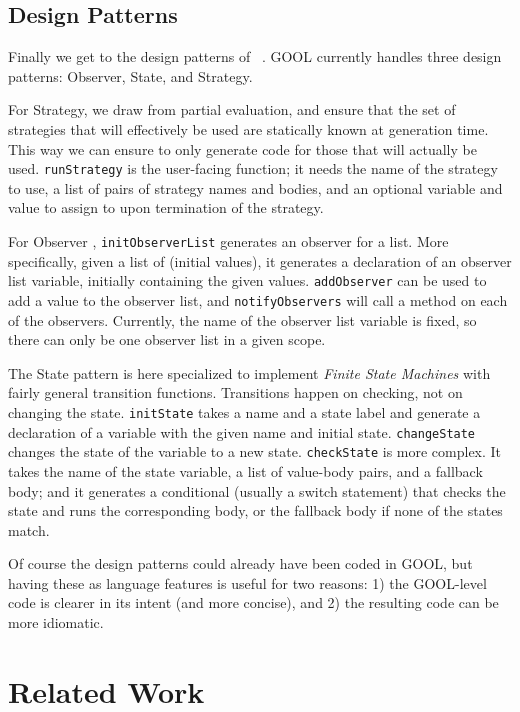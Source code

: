 \documentclass[sigplan,review,anonymous,prologue,dvipsnames]{acmart}
\begin{document}
\subsection{Design Patterns}
Finally we get to the design patterns of ~\cite{gamma1995design}. GOOL
currently handles three design patterns: Observer,
State, and Strategy. 

For Strategy, we draw from partial evaluation, and ensure that the set of
strategies that will effectively be used are statically known at generation
time.  This way we can ensure to only generate code for those that will
actually be used.  \verb|runStrategy| is the user-facing function; it needs the
name of the strategy to use, a list of pairs of strategy names and bodies, and
an optional variable and value to assign to upon termination of the strategy.

For Observer , \verb|initObserverList| generates an observer for a list.  More
specifically, given a list of (initial values), it generates a declaration of
an observer list variable, initially containing the given values.
\verb|addObserver| can be used to add a value to the observer list, and
\verb|notifyObservers| will call a method on each of the observers. Currently,
the name of the observer list variable is fixed, so there can only be one
observer list in a given scope.

The State pattern is here specialized to implement \emph{Finite State Machines}
with fairly general transition functions.  Transitions happen on checking, not
on changing the state.  \verb|initState| takes a name and a state label and
generate a declaration of a variable with the given name and initial state.
\verb|changeState| changes the state of the variable to a new state.
\verb|checkState| is more complex.  It takes the name of the state variable, a
list of value-body pairs, and a fallback body; and it generates a conditional
(usually a switch statement) that checks the state and runs the corresponding
body, or the fallback body if none of the states match.

Of course the design patterns could already have been coded in GOOL, but
having these as language features is useful for two reasons: 1) the GOOL-level
code is clearer in its intent (and more concise), and 2) the resulting code
can be more idiomatic.

\section{Related Work} \label{sec:related}
\end{document}
